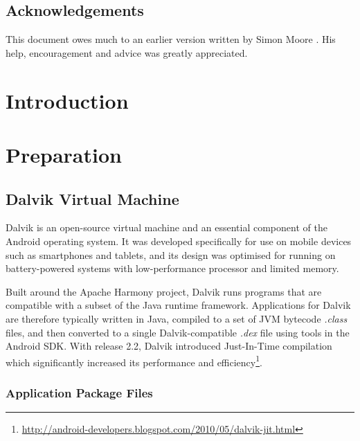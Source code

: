 \documentclass[12pt,twoside,notitlepage]{report}
\begin{document}
\newpage
\section*{Acknowledgements}

This document owes much to an earlier version written by Simon Moore
\cite{moore95}.  His help, encouragement and advice was greatly 
appreciated.


\cleardoublepage        %

\setcounter{page}{1}
\pagestyle{headings}

\chapter{Introduction}


\cleardoublepage
\chapter{Preparation}

\section{Dalvik Virtual Machine}

Dalvik is an open-source virtual machine and an essential component of the Android operating system. It was developed specifically for use on mobile devices such as smartphones and tablets, and its design was optimised for running on battery-powered systems with low-performance processor and limited memory. 

Built around the Apache Harmony project, Dalvik runs programs that are compatible with a subset of the Java runtime framework. Applications for Dalvik are therefore typically written in Java, compiled to a set of JVM bytecode \emph{.class} files, and then converted to a single Dalvik-compatible \emph{.dex} file using tools in the Android SDK. With release 2.2, Dalvik introduced Just-In-Time compilation which significantly increased its performance and efficiency\footnote{\url{http://android-developers.blogspot.com/2010/05/dalvik-jit.html}}.

\subsection{Application Package Files}
\end{document}
